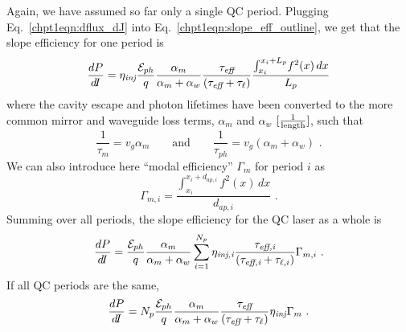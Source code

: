 \documentclass[12pt]{report}
\begin{document}
\bigskip
\noindent
Again, we have assumed so far only a single QC period.  Plugging Eq.~\eqref{chpt1eqn:dflux_dJ} into Eq.~\eqref{chpt1eqn:slope_eff_outline}, we get that the slope efficiency for one period is
\begin{equation}
\frac{d P}{d\!I} = \eta_\textit{inj}  \frac{\EE_{ph}}{q} \frac{\alpha_m}{\alpha_m+\alpha_w}  \frac{\tau_\textit{eff}}{\left(\tau_\textit{eff}+\tau_{\ell}\right)} \frac{\int_{x_i}^{x_i+L_p} \! f^2(x) \, dx}{L_p}
\end{equation}
where the cavity escape and photon lifetimes have been converted to the more common mirror and waveguide loss terms, $\alpha_m$ and $\alpha_w$ $[\frac{1}{\textnormal{length}}]$, such that
\begin{equation}
\frac{1}{\tau_m}=v_g \alpha_m \qquad \text{and} \qquad \frac{1}{\tau_{ph}}=v_g (\alpha_m + \alpha_w) \text{~.}
\end{equation}
We can also introduce here ``modal efficiency'' $\Gamma_m$ for period $i$ as
\begin{equation}
\Gamma_{m,i} = \frac{\int_{x_i}^{x_i+d_{ap,i}} \! f^2(x) \, dx}{d_{ap,i}} \text{~.}
\end{equation}
Summing over all periods, the slope efficiency for the QC laser as a whole is
\begin{equation}
\frac{d P}{d\!I} = \frac{\EE_{ph}}{q} \frac{\alpha_m}{\alpha_m+\alpha_w}   \sum_{i=1}^{N_p} \eta_\textit{inj,i} \frac{\tau_\textit{eff,i}}{\left(\tau_\textit{eff,i}+\tau_{\ell,i}\right)} \Gamma_{m,i} \text{~.}
\end{equation}
If all QC periods are the same,
\begin{equation}
\frac{d P}{d\!I} = N_p \frac{\EE_{ph}}{q} \frac{\alpha_m}{\alpha_m+\alpha_w}   \frac{\tau_\textit{eff}}{\left(\tau_\textit{eff}+\tau_{\ell}\right)} \eta_\textit{inj} \Gamma_{m} \text{~.}
\end{equation}
\end{document}
